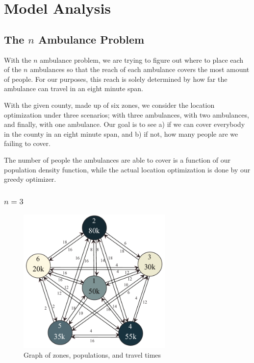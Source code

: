\documentclass[notitlepage, 12pt]{article}
\begin{document}
\section{Model Analysis}

\subsection{The $n$ Ambulance Problem}
With the $n$ ambulance problem, we are trying to figure out where to place each of the $n$ ambulances so that the reach of each ambulance covers the most amount of people. For our purposes, this reach is solely determined by how far the ambulance can travel in an eight minute span.

With the given county, made up of six zones, we consider the location optimization under three scenarios; with three ambulances, with two ambulances, and finally, with one ambulance. Our goal is to see a) if we can cover everybody in the county in an eight minute span, and b) if not, how many people are we failing to cover.

The number of people the ambulances are able to cover is a function of our population density function, while the actual location optimization is done by our greedy optimizer.

\subsubsection{$n=3$}

\begin{figure}[htbp]
\label{fig:fullgraph}
\begin{center}
\includegraphics[width=3in]{6point.pdf}
\caption{Graph of zones, populations, and travel times}
\end{center}
\end{figure}
\end{document}
